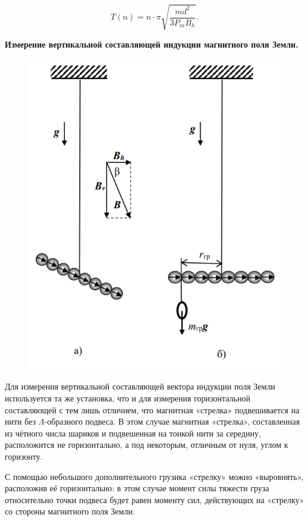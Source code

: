 \documentclass[a4paper,12pt]{article} %
\begin{document}
\begin{equation*}
	T(n) = n \cdot \pi\sqrt{\frac{md^2}{3P_mB_h}}.
\end{equation*}
\vspace{20mm}

\textbf{Измерение вертикальной составляющей индукции магнитного поля Земли.}

\begin{figure}[h!]
	\centering
	\includegraphics[scale=0.7]{Вер.png}
\end{figure}

Для измерения вертикальной составляющей вектора индукции поля Земли используется та же установка, что и для измерения горизонтальной составляющей с тем лишь отличием, что магнитная «стрелка» подвешивается на нити без $\Lambda$-образного подвеса. В этом случае магнитная «стрелка», составленная из чётного числа шариков и подвешенная на тонкой нити за середину, расположится не горизонтально, а под некоторым, отличным от нуля, углом к горизонту.

С помощью небольшого дополнительного грузика «стрелку» можно «выровнять», расположив её горизонтально: в этом случае момент силы тяжести груза относительно точки подвеса будет равен моменту сил, действующих на «стрелку» со стороны магнитного поля Земли.
\vspace{15mm}
\end{document}
